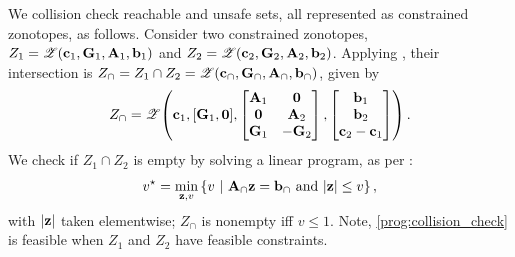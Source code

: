 We collision check reachable and unsafe sets, all represented as constrained zonotopes, as follows.
Consider two constrained zonotopes, $Z_1 = \mathcal{Z}\!\left({\mathbf{c}}_1,{\mathbf{G}}_1,{\mathbf{A}}_1,{\mathbf{b}}_1\right)$ and $Z_2 = \mathcal{Z}\!\left({\mathbf{c}}_2,{\mathbf{G}}_2,{\mathbf{A}}_2,{\mathbf{b}}_2\right)$.
Applying \cite[Prop. 1]{conf:const_zono}, their intersection is $Z_\cap = Z_1 \cap Z_2 = \mathcal{Z}\!\left({\mathbf{c}}_{\cap},{\mathbf{G}}_{\cap},{\mathbf{A}}_{\cap},{\mathbf{b}}_{\cap}\right)$, given by
\begin{align}
Z_\cap =  \mathcal{Z}\!\left({\mathbf{c}}_1, [{\mathbf{G}}_1, {\mathbf{0}}], \begin{bmatrix}
            {\mathbf{A}}_1 & {\mathbf{0}} \\
            {\mathbf{0}} & {\mathbf{A}}_2 \\
            {\mathbf{G}}_1 & -{\mathbf{G}}_2
        \end{bmatrix}, \begin{bmatrix}
            {\mathbf{b}}_1 \\ {\mathbf{b}}_2 \\ {\mathbf{c}}_2 - {\mathbf{c}}_1
        \end{bmatrix}\right).
\end{align}
We check if $Z_1 \cap Z_2$ is empty by solving a linear program, as per \cite[Prop. 2]{conf:const_zono}:
\begin{align}\label{prog:collision_check}
    v^\star = \min_{{\mathbf{z}},v} \left\{v\ |\ {\mathbf{A}}_{\cap} {\mathbf{z}} = {\mathbf{b}}_{\cap} \ \mathrm{\textnormal{and}}\ |{\mathbf{z}}| \leq v\right\},
\end{align}
with $|{\mathbf{z}}|$ taken elementwise; $Z_\cap$ is nonempty iff $v \leq 1$.
Note, \eqref{prog:collision_check} is feasible when $Z_1$ and $Z_2$ have feasible constraints.


